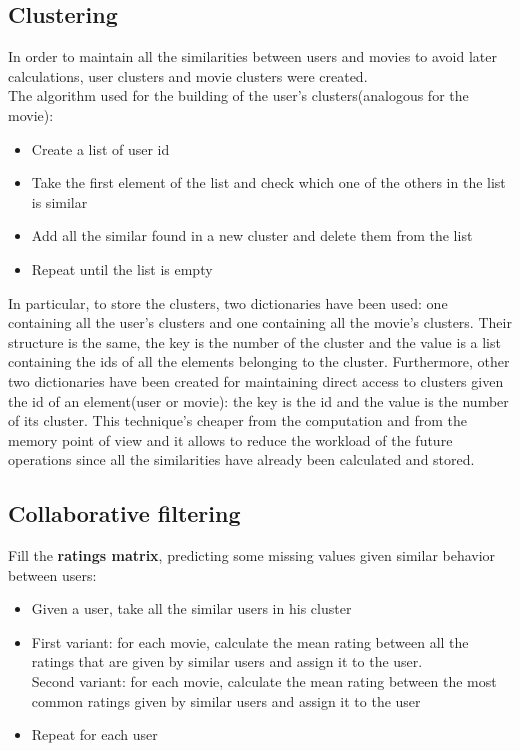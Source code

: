\documentclass{article}
\begin{document}
\subsection{Clustering}
In order to maintain all the similarities between users and movies to avoid later calculations, user clusters and movie clusters were created.\\
The algorithm used for the building of the user's clusters(analogous for the movie):
\begin{itemize}
    \item Create a list of user id
    \item Take the first element of the list and check which one of the others in the list is similar
    \item Add all the similar found in a new cluster and delete them from the list
    \item Repeat until the list is empty
\end{itemize}
In particular, to store the clusters, two dictionaries have been used: one containing all the user's clusters and one containing all the movie's clusters. Their structure is the same, the key is the number of the cluster and the value is a list containing the ids of all the elements belonging to the cluster. Furthermore, other two dictionaries have been created for maintaining direct access to clusters given the id of an element(user or movie): the key is the id and the value is the number of its cluster. 
\newline
This technique's cheaper from the computation and from the memory point of view and it allows to reduce the workload of the future operations since all the similarities have already been calculated and stored.


\subsection{Collaborative filtering}
Fill the \textbf{ratings matrix}, predicting some missing values given similar behavior between users:
\begin{itemize}
    \item Given a user, take all the similar users in his cluster
    \item First variant: for each movie, calculate the mean rating between all the ratings that are given by similar users and assign it to the user.\\
    Second variant: for each movie, calculate the mean rating between the most common ratings given by similar users and assign it to the user
    \item Repeat for each user
\end{itemize}
\end{document}
